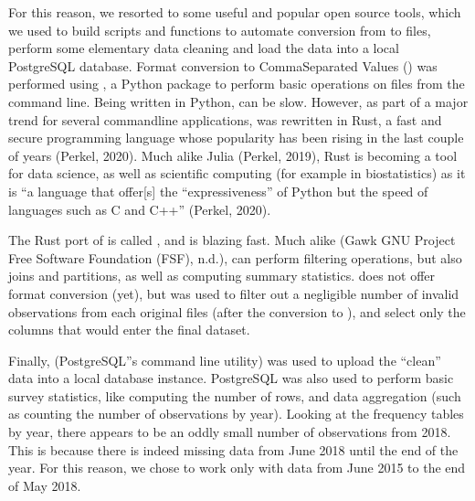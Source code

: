 \documentclass[letterpaper,10pt,english]{jupyterBook}
\begin{document}
\sphinxAtStartPar
For this reason, we resorted to some useful and popular open source tools, which we used to build  scripts and functions to automate conversion from  to  files, perform some elementary data cleaning and load the data into a local PostgreSQL database. Format conversion to Comma\sphinxhyphen{}Separated Values () was performed using , a Python package to perform basic operations on  files from the command line. Being written in Python,  can be slow. However, as part of a major trend for several command\sphinxhyphen{}line applications,  was rewritten in Rust, a fast and secure programming language whose popularity has been rising in the last couple of years (Perkel, 2020). Much alike Julia (Perkel, 2019), Rust is becoming a tool for data science, as well as scientific computing (for example in bio\sphinxhyphen{}statistics) as it is “a language that offer{[}s{]} the “expressiveness” of Python but the speed of languages such as C and C++” (Perkel, 2020).

\sphinxAtStartPar
The Rust port of  is called , and is blazing fast. Much alike  (Gawk \sphinxhyphen{} GNU Project \sphinxhyphen{} Free Software Foundation (FSF), n.d.),  can perform filtering operations, but also joins and partitions, as well as computing summary statistics.  does not offer format conversion (yet), but was used to filter out a negligible number of invalid observations from each original  files (after the conversion to ), and select only the columns that would enter the final dataset.

\sphinxAtStartPar
Finally,  (PostgreSQL”s command line utility) was used to upload the “clean” data into a local database instance. PostgreSQL was also used to perform basic survey statistics, like computing the number of rows, and data aggregation (such as counting the number of observations by year). Looking at the frequency tables by year, there appears to be an oddly small number of observations from 2018. This is because there is indeed missing data from June 2018 until the end of the year. For this reason, we chose to work only with data from June 2015 to the end of May 2018.
\end{document}
